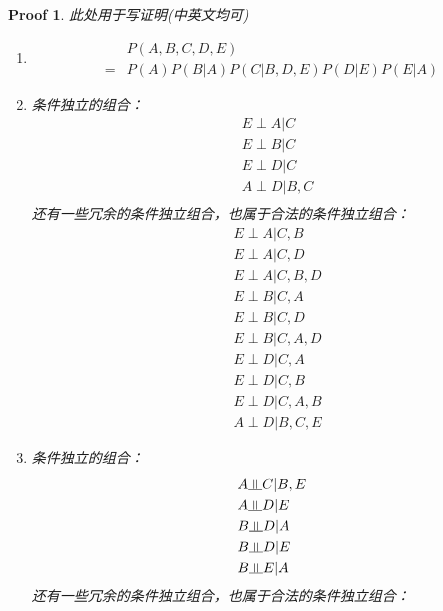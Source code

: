 \documentclass[a4paper,UTF8]{article}
\numberwithin{equation}{section}
\newtheorem*{myProof}{Proof}
\newcommand{\indep}{\rotatebox[origin=c]{90}{$\models$}}
\begin{document}
\begin{myProof}
	此处用于写证明(中英文均可)
	~\\
\begin{enumerate}[(1)]
\item 
\begin{equation}
\begin{aligned}
&P(A,B,C,D,E)\\ 
=& P(A)P(B|A)P(C|B,D,E)P(D|E)P(E|A)
\end{aligned}
\end{equation}
\item 
条件独立的组合：
\begin{equation}
\begin{aligned}
&E \perp A | C\\
&E \perp B | C\\
&E \perp D | C\\
&A \perp D | B, C\\
\end{aligned}
\end{equation}
还有一些冗余的条件独立组合，也属于合法的条件独立组合：
\begin{equation}
\begin{aligned}
&E \perp A | C, B\\
&E \perp A | C, D\\
&E \perp A | C, B, D\\
&E \perp B | C, A\\
&E \perp B | C, D\\
&E \perp B | C, A, D\\
&E \perp D | C, A\\
&E \perp D | C, B\\
&E \perp D | C, A, B\\
&A \perp D | B, C, E
\end{aligned}
\end{equation}
\item 
条件独立的组合：
\begin{equation}
\begin{aligned}
&A \indep C | B,E\\
&A \indep D | E\\
&B \indep D | A\\
&B \indep D | E\\
&B \indep E | A\\
\end{aligned}
\end{equation}
还有一些冗余的条件独立组合，也属于合法的条件独立组合：
\begin{equation}

\end{equation}
\end{enumerate}
\end{myProof}
\end{document}
